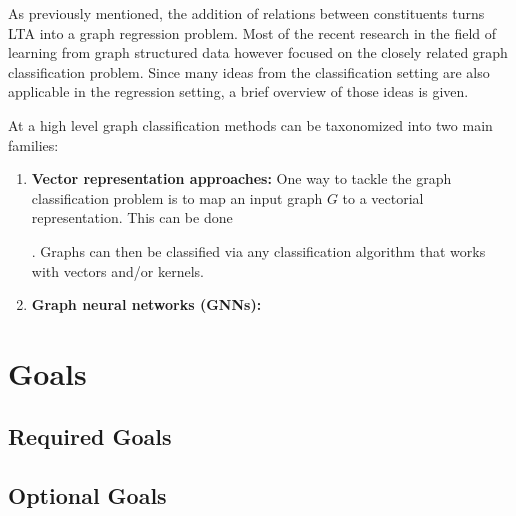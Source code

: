 \documentclass[12pt]{scrartcl}
\begin{document}
As previously mentioned, the addition of relations between constituents turns LTA into a graph regression problem.
Most of the recent research in the field of learning from graph structured data however focused on the closely related graph classification problem.
Since many ideas from the classification setting are also applicable in the regression setting, a brief overview of those ideas is given.

At a high level graph classification methods can be taxonomized into two main families:
\begin{enumerate}[label=\textbf{\arabic*.}]
	\item \textbf{Vector representation approaches:}
		One way to tackle the graph classification problem is to map an input graph $G$ to a vectorial representation.
		This can be done
		.
		Graphs can then be classified via any classification algorithm that works with vectors and/or kernels.
	\item \textbf{Graph neural networks (GNNs):}

\end{enumerate}

\section{Goals}%
\label{sec:goals}

\subsection{Required Goals}%
\label{sec:goals:req}

\subsection{Optional Goals}%
\label{sec:goals:opt}
\end{document}
